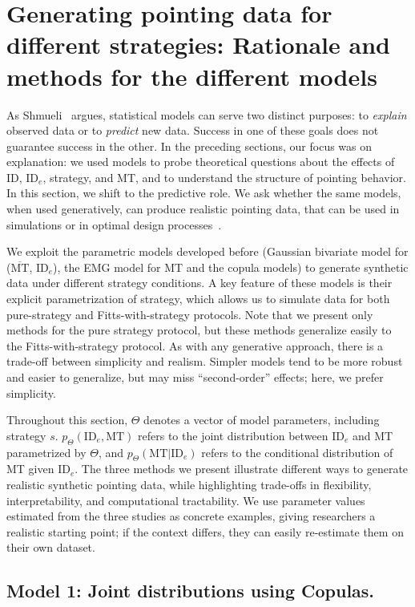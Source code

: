 \documentclass[acmlarge, manuscript,review]{acmart}
\newcommand{\mmt}{\ensuremath{\overline{\mt}}\xspace}
\newcommand{\mt}{\ensuremath{{\text{MT}}}\xspace}
\newcommand{\ide}{\ensuremath{{\text{ID}_e}}\xspace}
\begin{document}
\section{Generating pointing data for different strategies: Rationale and methods for the different models \label{sec:gen}}
As Shmueli~\cite{shmueli2010} argues, statistical models can serve two distinct purposes: to \textit{explain} observed data or to \textit{predict} new data. Success in one of these goals does not guarantee success in the other. In the preceding sections, our focus was on explanation: we used models to probe theoretical questions about the effects of ID, \ide, strategy, and MT, and to understand the structure of pointing behavior. In this section, we shift to the predictive role. We ask whether the same models, when used generatively, can produce realistic pointing data, that can be used \eg in simulations or in optimal design processes~\cite{oulasvirta2018,murray2022}.




We exploit the parametric models developed before (Gaussian bivariate model for (\mmt, \ide), the EMG model for MT and the copula models) to generate synthetic data under different strategy conditions. A key feature of these models is their explicit parametrization of strategy, which allows us to simulate data for both pure-strategy and Fitts-with-strategy protocols. Note that we present only methods for the pure strategy protocol, but these methods generalize easily to the Fitts-with-strategy protocol.
As with any generative approach, there is a trade-off between simplicity and realism. Simpler models tend to be more robust and easier to generalize, but may miss ``second-order'' effects; here, we prefer simplicity.


Throughout this section, $\Theta$ denotes a vector of model parameters, including strategy $s$. $p_{\Theta}(\ide, \mt)$ refers to the joint distribution between \ide and MT parametrized by $\Theta$, and $p_{\Theta}(\mt|\ide)$ refers to the conditional distribution of MT given \ide. The three methods we present illustrate different ways to generate realistic synthetic pointing data, while highlighting trade-offs in flexibility, interpretability, and computational tractability.
We use parameter values estimated from the three studies as concrete examples, giving researchers a realistic starting point; if the context differs, they can easily re-estimate them on their own dataset.


\subsection{Model 1: Joint distributions using Copulas.}
\end{document}
